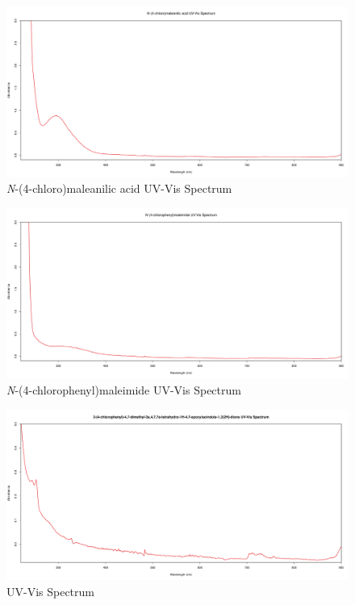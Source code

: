 \documentclass[11pt]{article}
\begin{document}
\begin{figure}[H]
    \centering
    \includegraphics[scale=0.33]{spectra/uvvis9.1.png}
    \caption{\textit{N}-(4-chloro)maleanilic acid UV-Vis Spectrum}
\end{figure}
\begin{figure}[H]
    \centering
    \includegraphics[scale=0.33]{spectra/uvvis9.2.png}
    \caption{\textit{N}-(4-chlorophenyl)maleimide UV-Vis Spectrum}
\end{figure}
\begin{figure}[H]
    \centering
    \includegraphics[scale=0.33]{spectra/uvvis9.3.png}
    \caption{ UV-Vis Spectrum}
\end{figure}
\end{document}
